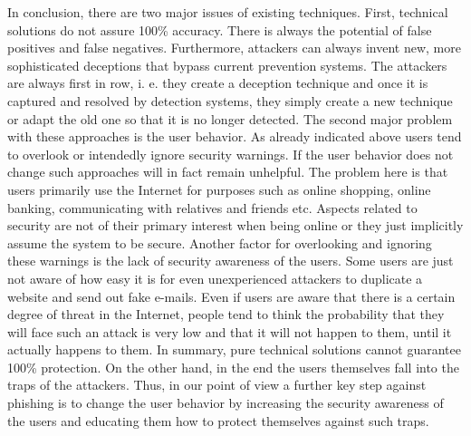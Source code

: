 In conclusion, there are two major issues of existing techniques.
 First, technical solutions do not assure 100\% accuracy.
 There is always the potential of false positives and false negatives.
 Furthermore, attackers can always invent new, more sophisticated deceptions that bypass current prevention systems.
 The attackers are always first in row, i.
e.
 they create a deception technique and once it is captured and resolved by detection systems, they simply create a new technique or adapt the old one so that it is no longer detected.
 The second major problem with these approaches is the user behavior.
 As already indicated above users tend to overlook or intendedly ignore security warnings.
 If the user behavior does not change such approaches will in fact remain unhelpful.
 The problem here is that users primarily use the Internet for purposes such as online shopping, online banking, communicating with relatives and friends etc.
 Aspects related to security are not of their primary interest when being online or they just implicitly assume the system to be secure.
 Another factor for overlooking and ignoring these warnings is the lack of security awareness of the users.
 Some users are just not aware of how easy it is for even unexperienced attackers to duplicate a website and send out fake e-mails.
 Even if users are aware that there is a certain degree of threat in the Internet, people tend to think the probability that they will face such an attack is very low and that it will not happen to them, until it actually happens to them.
 In summary, pure technical solutions cannot guarantee 100\% protection.
 On the other hand, in the end the users themselves fall into the traps of the attackers.
 Thus, in our point of view a further key step against phishing is to change the user behavior by increasing the security awareness of the users and educating them how to protect themselves against such traps.



